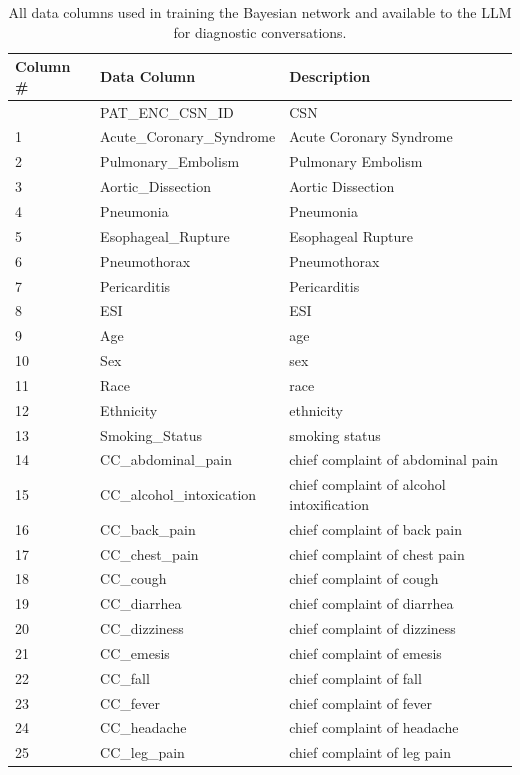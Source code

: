 \setlength\LTleft{0pt}
\setlength\LTright{0pt}
\begin{longtable}{@{\extracolsep{\fill}}lll}
\caption{All data columns used in training the Bayesian network and available to the LLM for diagnostic conversations.}\label{tab:aim3-data-columns1}\\

\hline
Column \# & Data Column & Description \\
\hline
\endhead

\hline
\endfoot
0 & PAT\_ENC\_CSN\_ID & CSN \\
1 & Acute\_Coronary\_Syndrome & Acute Coronary Syndrome \\
2 & Pulmonary\_Embolism & Pulmonary Embolism \\
3 & Aortic\_Dissection & Aortic Dissection \\
4 & Pneumonia & Pneumonia \\
5 & Esophageal\_Rupture & Esophageal Rupture \\
6 & Pneumothorax & Pneumothorax \\
7 & Pericarditis & Pericarditis \\
8 & ESI & ESI \\
9 & Age & age \\
10 & Sex & sex \\
11 & Race & race \\
12 & Ethnicity & ethnicity \\
13 & Smoking\_Status & smoking status \\
14 & CC\_abdominal\_pain & chief complaint of abdominal pain \\
15 & CC\_alcohol\_intoxication & chief complaint of  alcohol intoxification \\
16 & CC\_back\_pain & chief complaint of back pain \\
17 & CC\_chest\_pain & chief complaint of chest pain \\
18 & CC\_cough & chief complaint of cough \\
19 & CC\_diarrhea & chief complaint of diarrhea \\
20 & CC\_dizziness & chief complaint of dizziness \\
21 & CC\_emesis & chief complaint of emesis \\
22 & CC\_fall & chief complaint of fall \\
23 & CC\_fever & chief complaint of fever \\
24 & CC\_headache & chief complaint of headache \\
25 & CC\_leg\_pain & chief complaint of leg pain \\

\end{longtable}
